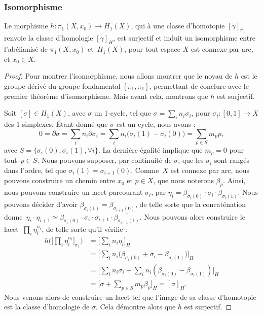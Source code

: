 \subsubsection{Isomorphisme}


\begin{theorem}
Le morphisme $h:\pi_1(X,x_0)\to H_1(X)$, qui à une classe d'homotopie $[\gamma]_{\pi_1}$ renvoie la classe d'homologie $[\gamma]_H$, est surjectif et induit un isomorphisme entre l'abélianisé de $\pi_1(X,x_0)$ et~$H_1(X)$, pour tout espace $X$ est connexe par arc, et $x_0\in X$.
\end{theorem}

\begin{proof}
Pour montrer l'isomorphisme, nous allons montrer que le noyau de $h$ est le groupe dérivé du groupe fondamental $[\pi_1,\pi_1]$, permettant de conclure avec le premier théorème d'isomorphisme. Mais avant cela, montrons que $h$ est surjectif.

Soit $[\sigma]\in H_1(X)$, avec $\sigma$ un 1-cycle, tel que $\sigma=\sum_in_i\sigma_i$, pour $\sigma_i:[0,1]\to X$ des 1-simplexes. Étant donné que $\sigma$ est un cycle, nous avons : \[0=\partial\sigma=\sum_in_i\partial\sigma_i=\sum_in_i\big(\sigma_i(1)-\sigma_i(0)\big)=\sum_{p\in S}m_pp,\]avec $S=\{\sigma_i(0),\sigma_i(1),\forall i\}$. La dernière égalité implique que $m_p=0$ pour tout~$p\in S$. Nous pouvons supposer, par continuité de $\sigma$, que les $\sigma_i$ sont rangés dans l'ordre, tel que $\sigma_i(1)=\sigma_{i+1}(0)$. Comme~$X$ est connexe par arc, nous pouvons construire un chemin entre $x_0$ et $p\in X$, que nous noterons $\beta_p$. Ainsi, nous pouvons construire un lacet parcourant $\sigma_i$, par $\eta_i=\beta_{\sigma_i(0)}\cdot\sigma_i\cdot\overline{\beta_{\sigma_i(1)}}$. Nous pouvons décider d'avoir $\beta_{\sigma_i(1)}=\beta_{\sigma_{i+1}(0)}$, de telle sorte que la concaténation donne~$\eta_i\cdot\eta_{i+1}\simeq \beta_{\sigma_i(0)}\cdot\sigma_i\cdot\sigma_{i+1}\cdot\overline{\beta_{\sigma_{i+1}(1)}}$. Nous pouvons alors construire le lacet~$\prod_i\eta_i^{n_i}$, de telle sorte qu'il vérifie : \[\begin{split}
h\Bigg(\Big[\prod_i\eta_i^{n_i}\Big]_{\pi_1}\Bigg)&=\Big[\sum_in_i\eta_i\Big]_H\\
&=\Big[\sum_in_i\big(\beta_{\sigma_i(0)}+\sigma_i-\beta_{\sigma_i(1)}\big)\Big]_H\\
&=\Big[\sum_in_i\sigma_i+\sum_in_i(\beta_{\sigma_i(0)}-\beta_{\sigma_i(1)})\Big]_H\\
&=\Big[\sigma+\sum_{p\in S}m_p\beta_p\Big]_H=[\sigma]_H.
\end{split}\]Nous venons alors de construire un lacet tel que l'image de sa classe d'homotopie est la classe d'homologie de $\sigma$. Cela démontre alors que $h$ est surjectif.


\end{proof}
